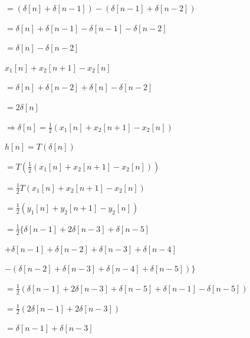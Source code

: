 \documentclass[fleqn]{article}
\begin{document}
\begin{enumerate}[nolistsep]
\begin{enumerate}
			$ = (\delta[n] + \delta[n-1]) - (\delta[n-1] + \delta[n-2])$
			
			$ = \delta[n] + \delta[n-1] - \delta[n-1] - \delta[n-2]$
			
			$ = \delta[n] - \delta[n-2]$
			
			$x_1[n] + x_2[n+1] - x_2[n]$
			
			$ = \delta[n] + \delta[n-2] + \delta[n] - \delta[n-2]$
			
			$ = 2\delta[n]$
			
			$\Rightarrow \delta[n] = \frac{1}{2}(x_1[n] + x_2[n+1] - x_2[n])$
			
			$h[n] = T(\delta[n])$
			
			$ = T(\frac{1}{2}(x_1[n] + x_2[n+1] - x_2[n]))$
			
			$ = \frac{1}{2}T(x_1[n] + x_2[n+1] - x_2[n])$
			
			$ = \frac{1}{2}(y_1[n] + y_2[n+1] - y_2[n])$
			
			$ = \frac{1}{2}\{\delta[n-1] + 2\delta[n-3] + \delta[n-5]$
			
			$ + \delta[n-1] + \delta[n-2] + \delta[n-3] + \delta[n-4]$
			
			$ - (\delta[n-2] + \delta[n-3] + \delta[n-4] + \delta[n-5])\}$
			
			$ = \frac{1}{2}(\delta[n-1] + 2\delta[n-3] + \delta[n-5] + \delta[n-1] - \delta[n-5])$
			
			$ = \frac{1}{2}(2\delta[n-1] + 2\delta[n-3])$
			
			$ = \delta[n-1] + \delta[n-3]$
			\end{enumerate}
		
	\end{enumerate}
\end{document}
